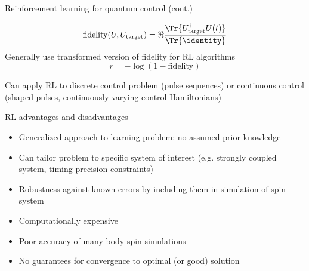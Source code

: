 \documentclass{beamer}
\begin{document}
\begin{frame}{Reinforcement learning for quantum control (cont.)}

\begin{equation*}
    \text{fidelity}(U, U_\text{target}) = \Re{
        \frac{\Tr{U_\text{target}^\dagger U(t)}}{\Tr{\identity}}
    }
\end{equation*}
Generally use transformed version of fidelity for RL algorithms
\begin{equation*}
    r = -\log \left( 1 - \text{fidelity} \right)
\end{equation*}

Can apply RL to discrete control problem (pulse sequences)
or continuous control (shaped pulses, continuously-varying control
Hamiltonians)

\end{frame}

\begin{frame}{RL advantages and disadvantages}

\begin{itemize}
    \item Generalized approach to learning problem: no assumed prior knowledge
    \item Can tailor problem to specific system of interest (e.g. strongly coupled system, timing precision constraints)
    \item Robustness against known errors by including them in simulation of spin system
\end{itemize}

\pause

\begin{itemize}
    \color{red}
    \item Computationally expensive
    \item Poor accuracy of many-body spin simulations
    \item No guarantees for convergence to optimal (or good) solution
\end{itemize}

\end{frame}
\end{document}
